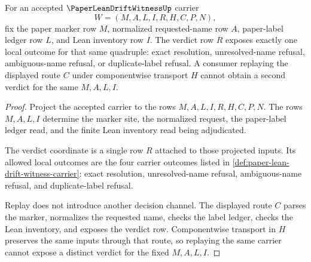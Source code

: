 \begin{theorem}
\label{thm:paper-lean-drift-witness-verdict-determinism}
For an accepted $\PaperLeanDriftWitnessUp$ carrier
$$
W=(M,A,L,I,R,H,C,P,N),
$$
fix the paper marker row $M$, normalized requested-name row $A$, paper-label ledger row $L$, and Lean inventory row $I$. The verdict row $R$ exposes exactly one local outcome for that same quadruple: exact resolution, unresolved-name refusal, ambiguous-name refusal, or duplicate-label refusal. A consumer replaying the displayed route $C$ under componentwise transport $H$ cannot obtain a second verdict for the same $M,A,L,I$.
\end{theorem}
\begin{proof}
Project the accepted carrier to the rows $M,A,L,I,R,H,C,P,N$. The rows $M,A,L,I$ determine the marker site, the normalized request, the paper-label ledger read, and the finite Lean inventory read being adjudicated.

The verdict coordinate is a single row $R$ attached to those projected inputs. Its allowed local outcomes are the four carrier outcomes listed in \autoref{def:paper-lean-drift-witness-carrier}: exact resolution, unresolved-name refusal, ambiguous-name refusal, and duplicate-label refusal.

Replay does not introduce another decision channel. The displayed route $C$ parses the marker, normalizes the requested name, checks the label ledger, checks the Lean inventory, and exposes the verdict row. Componentwise transport in $H$ preserves the same inputs through that route, so replaying the same carrier cannot expose a distinct verdict for the fixed $M,A,L,I$.
\end{proof}

